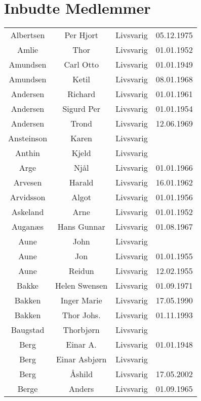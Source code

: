 ﻿
\chapter*{Inbudte Medlemmer}

    \begin{tabular}{cccc}
        Albertsen	&	Per Hjort	&	Livsvarig 	&	05.12.1975	\\
        Amlie	&	Thor	&	Livsvarig 	&	01.01.1952	\\
        Amundsen	&	Carl Otto	&	Livsvarig 	&	01.01.1949	\\
        Amundsen	&	Ketil	&	Livsvarig 	&	08.01.1968	\\
        Andersen	&	Richard	&	Livsvarig 	&	01.01.1961	\\
        Andersen	&	Sigurd Per	&	Livsvarig 	&	01.01.1954	\\
        Andersen	&	Trond	&	Livsvarig 	&	12.06.1969	\\
        Ansteinson	&	Karen	&	Livsvarig 	&		\\
        Anthin	&	Kjeld	&	Livsvarig 	&		\\
        Arge	&	Njål	&	Livsvarig 	&	01.01.1966	\\
        Arvesen	&	Harald	&	Livsvarig 	&	16.01.1962	\\
        Arvidsson	&	Algot	&	Livsvarig 	&	01.01.1956	\\
        Askeland	&	Arne	&	Livsvarig 	&	01.01.1952	\\
        Auganæs	&	Hans Gunnar	&	Livsvarig 	&	01.08.1967	\\
        Aune	&	John	&	Livsvarig 	&		\\
        Aune	&	Jon	&	Livsvarig 	&	01.01.1955	\\
        Aune	&	Reidun	&	Livsvarig 	&	12.02.1955	\\
        Bakke	&	Helen Swensen	&	Livsvarig 	&	01.09.1971	\\
        Bakken	&	Inger Marie	&	Livsvarig 	&	17.05.1990	\\
        Bakken	&	Thor Johs.	&	Livsvarig 	&	01.11.1993	\\
        Baugstad	&	Thorbjørn	&	Livsvarig 	&		\\
        Berg	&	Einar A.	&	Livsvarig 	&	01.01.1948	\\
        Berg	&	Einar Asbjørn	&	Livsvarig 	&		\\
        Berg 	&	Åshild	&	Livsvarig	&	17.05.2002	\\
        Berge	&	Anders	&	Livsvarig 	&	01.09.1965	\\

\end{tabular}
